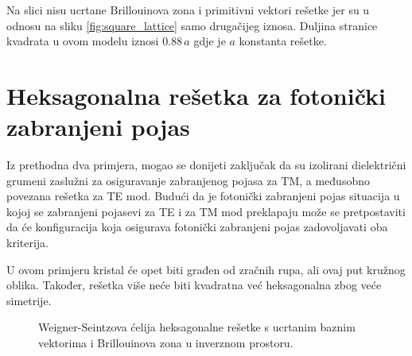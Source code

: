 \documentclass[utf8, seminar, numeric]{fer}
\begin{document}
Na slici nisu ucrtane Brillouinova zona i primitivni vektori rešetke jer su u
odnosu na sliku \ref{fig:square_lattice} samo drugačijeg iznosa. Duljina stranice
kvadrata u ovom modelu iznosi $0.88 \, a$ gdje je $a$ konstanta rešetke.

\FloatBarrier

\section {Heksagonalna rešetka za fotonički zabranjeni pojas}\label{sec:fbg}

Iz prethodna dva primjera, mogao se donijeti zaključak da su izolirani
dielektrični grumeni zaslužni za osiguravanje zabranjenog pojasa za TM, a
međusobno povezana rešetka za TE mod. Budući da je fotonički zabranjeni pojas
situacija u kojoj se zabranjeni pojasevi za TE i za TM mod preklapaju može se
pretpostaviti da će konfiguracija koja osigurava fotonički zabranjeni pojas
zadovoljavati oba kriterija.

U ovom primjeru kristal će opet biti građen od zračnih rupa, ali ovaj put
kružnog oblika. Također, rešetka više neće biti kvadratna već heksagonalna zbog
veće simetrije.

\begin{figure}[ht]
\centering
    \qquad
	\caption{Weigner-Seintzova ćelija heksagonalne rešetke s ucrtanim baznim
	vektorima i Brillouinova zona u inverznom prostoru.}
	\label{fig:triangular_lattice}
\end{figure}
\end{document}
